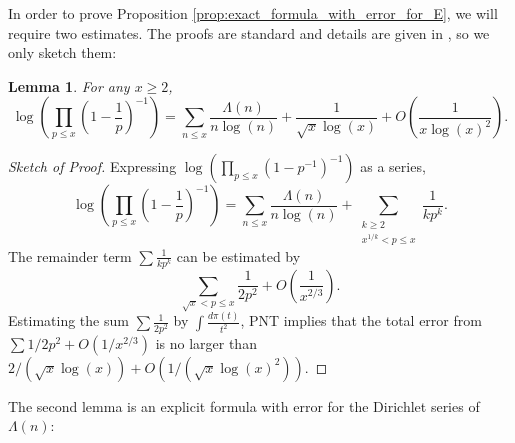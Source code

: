 \documentclass[12pt,reqno]{amsart}
\newtheorem{lemma}[theorem]{Lemma}
\theoremstyle{definition}
\numberwithin{equation}{section}
\begin{document}
    In order to prove Proposition \ref{prop:exact_formula_with_error_for_E}, we will require two estimates. The proofs are standard and details are given in \cite{La}, so we only sketch them:

    \begin{lemma}\label{lem:lemma_1}
        For any $x \ge 2$,
        \[
            \log\left(\prod_{p \le x}\left(1-\frac{1}{p}\right)^{-1}\right) = \sum_{n \le x}\frac{\Lambda(n)}{n\log(n)}+\frac{1}{\sqrt{x}\log(x)}+O\left(\frac{1}{x\log(x)^{2}}\right).
        \]
    \end{lemma}
    \begin{proof}[Sketch of Proof]
        Expressing $\log(\prod_{p \le x}(1-p^{-1})^{-1})$ as a series,
        \[
            \log\left(\prod_{p \le x}\left(1-\frac{1}{p}\right)^{-1}\right) = \sum_{n \le x}\frac{\Lambda(n)}{n\log(n)}+\sum_{\substack{k \ge 2 \\ x^{1/k} < p \le x}}\frac{1}{kp^{k}}.
        \]
        The remainder term $\sum\frac{1}{kp^{k}}$ can be estimated by
        \[
            \sum_{\sqrt{x} < p \le x}\frac{1}{2p^{2}}+O\left(\frac{1}{x^{2/3}}\right).
        \]
        Estimating the sum $\sum\frac{1}{2p^{2}}$ by $\int\frac{d\pi(t)}{t^{2}}$, PNT implies that the total error from $\sum1/2p^{2}+O(1/x^{2/3})$ is no larger than $2/(\sqrt{x}\log(x))+O(1/(\sqrt{x}\log(x)^{2}))$.
    \end{proof}

    The second lemma is an explicit formula with error for the Dirichlet series of $\Lambda(n)$:
\end{document}
